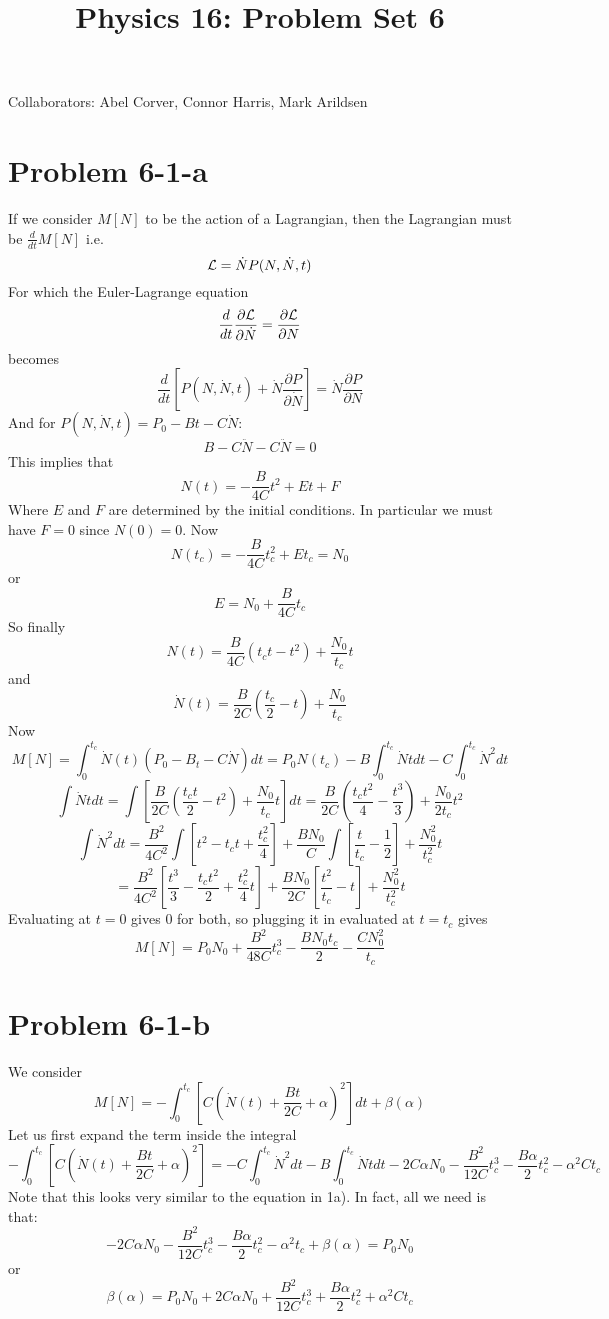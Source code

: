 \title{Physics 16: Problem Set 6}

\maketitle
\begin{center}
Collaborators: Abel Corver, Connor Harris, Mark Arildsen
\end{center}
\section*{Problem 6-1-a}
If we consider $M[N]$ to be the action of a Lagrangian, then the Lagrangian must be $\frac{d}{dt} M[N]$ i.e.
\[ \mathcal{L} = \dot{N}P(N,\dot{N},t) \]
For which the Euler-Lagrange equation
\[ \frac{d}{dt}\frac{\partial \mathcal{L}}{\partial \dot{N}} = \frac{\partial 
\mathcal{L}}{\partial N} \]
becomes
\[ \frac{d}{dt} \left[ P(N,\dot{N},t)+\dot{N}\frac{\partial P}{\partial \dot{N}} \right] = \dot{N}\frac{\partial P}{\partial N} \] 
And for $P(N,\dot{N},t) = P_0-Bt-C\dot{N}$:
\[ B-C\ddot{N} - C\ddot{N} = 0 \]
This implies that
\[ N(t) = -\frac{B}{4C}t^2 + Et + F\]
Where $E$ and $F$ are determined by the initial conditions.
In particular we must have $F=0$ since $N(0) = 0$. Now
\[ N(t_c) = -\frac{B}{4C}t_c^2 + Et_c = N_0 \]
or 
\[ E = N_0 + \frac{B}{4C}t_c \]
So finally
\[ N(t) = \frac{B}{4C}(t_c t-t^2) + \frac{N_0}{t_c} t \]
and
\[ \dot{N}(t) = \frac{B}{2C}\left(\frac{t_c}{2}-t\right) + \frac{N_0}{t_c} \]
Now
\[ M[N] = \int_0^{t_c} \dot{N}(t)\left(P_0 - B_t - C \dot{N} \right) dt = P_0 N(t_c) - B \int_0^{t_c} \dot{N} t  dt -  C \int_0^{t_c} \dot{N}^2 dt \]
\[ \int \dot{N} t dt  =  \int \left[ \frac{B}{2C}\left(\frac{t_c t}{2}-t^2\right) + \frac{N_0}{t_c} t \right] dt = \frac{B}{2C}\left(\frac{t_c t^2}{4}-\frac{t^3}{3}\right) + \frac{N_0}{2t_c} t^2   \]
\[ \int \dot{N}^2 dt = \frac{B^2}{4C^2}\int \left[t^2 - t_c t + \frac{t_c^2}{4} \right] + \frac{BN_0}{C}\int \left[\frac{t}{t_c} - \frac{1}{2} \right] + \frac{N_0^2}{t_c^2} t \]\[ =
  \frac{B^2}{4C^2} \left[ \frac{t^3}{3} - \frac{t_c t^2}{2} + \frac{t_c^2}{4}t \right ] + \frac{BN_0}{2C} \left[ \frac{t^2}{t_c} - t \right ] + \frac{N_0^2}{t_c^2} t  \]
Evaluating at $t=0$ gives $0$ for both, so plugging it in evaluated at $t=t_c$ gives
\[ M[N] = P_0 N_0 + \frac{B^2}{48 C} t_c^3 - \frac{B N_0 t_c}{2} - \frac{C N_0^2}{t_c} \]
\section*{Problem 6-1-b}
We consider
\[ M[N] = -\int_0^{t_c} \left[ C \left(\dot{N}(t)+\frac{Bt}{2C}+\alpha\right)^2 \right] dt + \beta(\alpha) \]
Let us first expand the term inside the integral
 \[  -\int_0^{t_c} \left[ C \left(\dot{N}(t)+\frac{Bt}{2C}+\alpha\right)^2 \right] =
 - C \int_0^{t_c} \dot{N}^2 dt
 - B \int_0^{t_c} \dot{N} t dt
 - 2C\alpha N_0
 - \frac{B^2}{12 C} t_c^3
 - \frac{B\alpha}{2} t_c^2
 - \alpha^2 C t_c
 \]  
 Note that this looks very similar to the equation in 1a). In fact, all we need is that:
 \[ -2C\alpha N_0 - \frac{B^2}{12 C} t_c^3 - \frac{B\alpha}{2}t_c^2  - \alpha^2 t_c + \beta(\alpha) = P_0N_0 \]
 or 
 \[ \beta(\alpha) =  P_0N_0 + 2C\alpha N_0 + \frac{B^2}{12 C} t_c^3 + \frac{B\alpha}{2}t_c^2 + \alpha^2 C t_c \]
